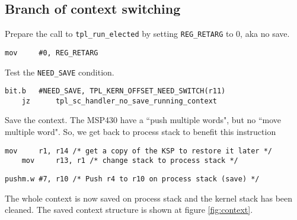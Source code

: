 \documentclass[11pt, oneside]{article}   	%
\begin{document}
\subsection{Branch of context switching}

Prepare the call to \lstinline{tpl_run_elected} by setting \lstinline{REG_RETARG} to 0, aka no save.
\begin{lstlisting}[backgroundcolor=\color{red!15}]
    mov     #0, REG_RETARG
\end{lstlisting}

Test the \lstinline{NEED_SAVE} condition.

\begin{lstlisting}[backgroundcolor=\color{red!15}]
    bit.b   #NEED_SAVE, TPL_KERN_OFFSET_NEED_SWITCH(r11)
    jz      tpl_sc_handler_no_save_running_context
\end{lstlisting}
Save the context. The MSP430 have a ``push multiple words", but no ``move multiple word". So, we get back to process stack to benefit this instruction

\begin{lstlisting}[backgroundcolor=\color{red!15}]
    mov     r1, r14	/* get a copy of the KSP to restore it later */
    mov     r13, r1	/* change stack to process stack */	
\end{lstlisting}
\vspace{-1em}
\begin{lstlisting}[backgroundcolor=\color{yellow!15}]
    pushm.w #7, r10	/* Push r4 to r10 on process stack (save) */
\end{lstlisting}


The whole context is now saved on process stack and the kernel stack has been cleaned. The saved context structure is shown at figure \ref{fig:context}.
\end{document}
